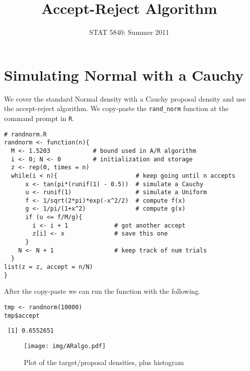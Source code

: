 \documentclass[11pt,english]{article}
\title{Accept-Reject Algorithm}
\date{STAT 5840: Summer 2011}
\begin{document}
\maketitle

\thispagestyle{empty}

\section*{Simulating Normal with a Cauchy}
\label{sec-1}

We cover the standard Normal density with a Cauchy proposal density and use the accept-reject algorithm.  We copy-paste the \texttt{rand\_norm} function at the command prompt in \texttt{R}.

\begin{verbatim}
# randnorm.R
randnorm <- function(n){
  M <- 1.5203            # bound used in A/R algorithm
  i <- 0; N <- 0         # initialization and storage
  z <- rep(0, times = n)
  while(i < n){                      # keep going until n accepts
      x <- tan(pi*(runif(1) - 0.5))  # simulate a Cauchy
      u <- runif(1)                  # simulate a Uniform
      f <- 1/sqrt(2*pi)*exp(-x^2/2)  # compute f(x)
      g <- 1/pi/(1+x^2)              # compute g(x)
      if (u <= f/M/g){
        i <- i + 1             # got another accept
        z[i] <- x              # save this one
      }
    N <- N + 1                 # keep track of num trials
  }
list(z = z, accept = n/N)                     
}
\end{verbatim}
After the copy-paste we can run the function with the following.
\begin{verbatim}
tmp <- randnorm(10000)
tmp$accept
\end{verbatim}

\begin{verbatim}
 [1] 0.6552651
\end{verbatim}



\begin{figure}[h!]
\centering
\texttt{[image: img/ARalgo.pdf]}
\caption{\label{fig:yplot}Plot of the target/proposal densities, plus histogram}
\end{figure}
\end{document}
